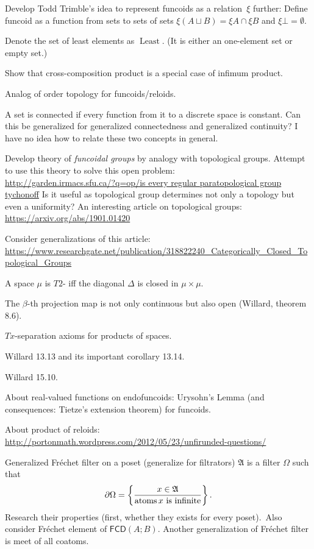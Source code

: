 \documentclass{amsart}
\begin{document}
Develop Todd Trimble's idea to represent funcoids as a relation~$\xi$ further:
Define funcoid as a function from sets to sets of sets
$\xi(A\sqcup B) = \xi A\cap\xi B$ and $\xi\bot=\emptyset$.

Denote the set of least elements as $\operatorname{Least}$. (It is either an
one-element set or empty set.)

Show that cross-composition product is a special case of infimum product.

Analog of order topology for funcoids/reloids.

A set is connected if every function from it to a discrete space is constant. Can this be generalized for generalized connectedness and generalized continuity? I have no idea how to relate these two concepts in general.

Develop theory of \emph{funcoidal groups} by analogy with topological groups.
Attempt to use this theory to solve this open problem:\\
\url{http://garden.irmacs.sfu.ca/?q=op/is every regular paratopological group tychonoff}
Is it useful as topological group determines not only a topology but even a uniformity?
An interesting article on topological groups:
\url{https://arxiv.org/abs/1901.01420}

Consider generalizations of this article: \\
\url{https://www.researchgate.net/publication/318822240_Categorically_Closed_Topological_Groups}

A space $\mu$ is $T 2$- iff the diagonal $\Delta$ is closed in $\mu\times\mu$.

The $\beta$-th projection map is not only continuous but also open (Willard, theorem 8.6).

$T x$-separation axioms for products of spaces.

Willard 13.13 and its important corollary 13.14.

Willard 15.10.

About real-valued functions on endofuncoids: Urysohn's Lemma (and consequences: Tietze's extension theorem) for funcoids.

About product of reloids:\\
\url{http://portonmath.wordpress.com/2012/05/23/unfirunded-questions/}

Generalized Fr\'echet filter on a poset (generalize for filtrators) $\mathfrak{A}$ is a filter $\Omega$ such that
\[ \partial\Omega = \left\{ \frac{x\in\mathfrak{A}}{\operatorname{atoms} x\text{ is infinite}}\right\}. \]
Research their properties (first, whether they exists for every poset).\
Also consider Fr\'echet element of $\mathsf{FCD}(A;B)$.
Another generalization of Fr\'echet filter is meet of all coatoms.
\end{document}
